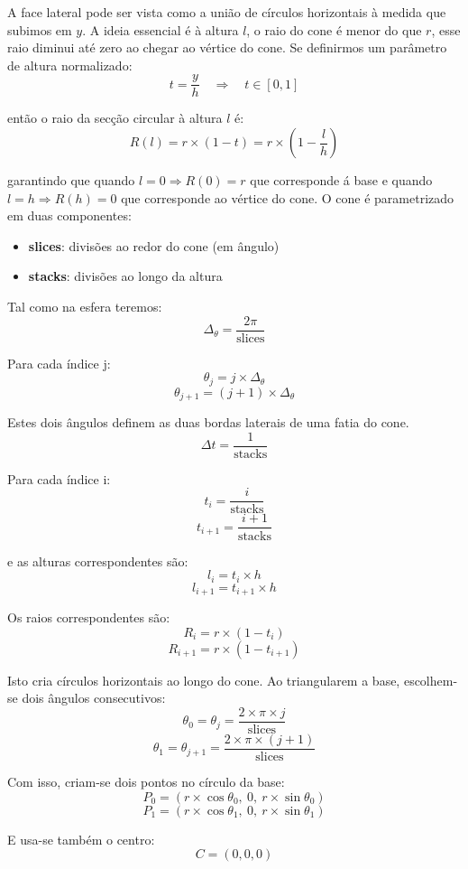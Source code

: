 \documentclass[11pt, a4paper, fleqn]{article}
\begin{document}
\noindent A face lateral pode ser vista como a união de círculos horizontais à medida que subimos em $y$. A ideia essencial é à altura $l$, o raio do cone é menor do que $r$, esse raio diminui até zero ao chegar ao vértice do cone. Se definirmos um parâmetro de altura normalizado:
\[
t = \frac{y}{h}
\quad \Rightarrow \quad t \in [0,1]
\]

\noindent então o raio da secção circular à altura $l$ é:
\[
R(l) = r \times (1 - t) = r \times \left(1 - \frac{l}{h}\right)
\]

\noindent garantindo que quando $l=0 \Rightarrow R(0)=r$ que corresponde á base e quando $l=h \Rightarrow R(h)=0$ que corresponde ao vértice do cone. O cone é parametrizado em duas componentes:
\begin{itemize}
    \item \textbf{slices}: divisões ao redor do cone (em ângulo)
    \item \textbf{stacks}: divisões ao longo da altura
\end{itemize}

\noindent Tal como na esfera teremos:
\[
\Delta_\theta = \frac{2\pi}{\text{slices}}
\]

\noindent Para cada índice j:
\[
\theta_j = j \times \Delta_\theta
\]
\[
\theta_{j+1} = (j+1) \times \Delta_\theta
\]

\noindent Estes dois ângulos definem as duas bordas laterais de uma fatia do cone.
\[
\Delta t = \frac{1}{\text{stacks}}
\]

\noindent Para cada índice i:
\[
t_i = \frac{i}{\text{stacks}}
\]
\[
t_{i+1} = \frac{i+1}{\text{stacks}}
\]

\noindent e as alturas correspondentes são:
\[
l_i = t_i \times h
\]
\[
l_{i+1} = t_{i+1} \times h
\]

\noindent Os raios correspondentes são:
\[
R_i = r \times (1 - t_i)
\]
\[
R_{i+1} = r \times (1 - t_{i+1})
\]

\noindent Isto cria círculos horizontais ao longo do cone. Ao triangularem a base, escolhem-se dois ângulos consecutivos:
\[
\theta_0 = \theta_j = \frac{2 \times \pi \times j}{\text{slices}}
\]
\[
\theta_1 = \theta_{j+1} = \frac{2 \times \pi \times (j+1)}{\text{slices}}
\]

\noindent Com isso, criam-se dois pontos no círculo da base:
\[
P_0 = (r \times \cos\theta_0,\ 0,\ r \times \sin\theta_0)
\]
\[
P_1 = (r \times \cos\theta_1,\ 0,\ r \times \sin\theta_1)
\]

\noindent E usa-se também o centro:
\[
C = (0,0,0)
\]
\end{document}
